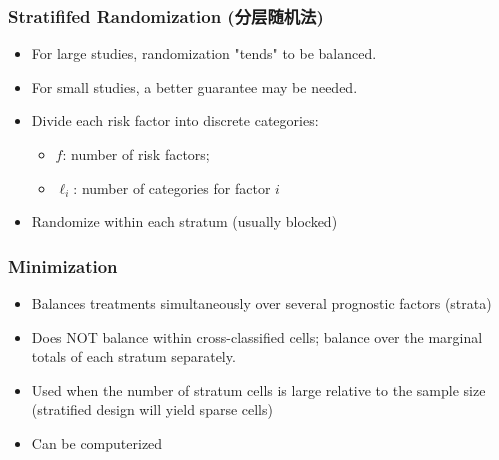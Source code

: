 \documentclass[table,10pt]{beamer}
\begin{document}
\begin{CJK*}{UTF8}{gbsn}
\begin{frame}[t]
\frametitle{Stratififed Randomization (分层随机法)}
\begin{itemize}
	\item For large studies, randomization "tends" to be balanced.
	\item For small studies, a better guarantee may be needed.
	\item Divide each risk factor into discrete categories:
	\begin{itemize}
		\item $f$: number of risk factors;
		\item $\ell_i$: number of categories for factor $i$ 
	\end{itemize}
	\item Randomize within each stratum (usually blocked)
\end{itemize}
\end{frame}


\begin{frame}[t]
\frametitle{Minimization}
\begin{itemize}
	\item Balances treatments simultaneously over several prognostic factors (strata)
	\item Does NOT balance \alert{within} cross-classified cells; balance over the 
		\alert{marginal totals} of each stratum separately.
	\item Used when the number of stratum cells is large relative to the sample size 
		(stratified design will yield sparse cells)
	\item Can be computerized 
\end{itemize}
\end{frame}



\end{CJK*}
\end{document}
